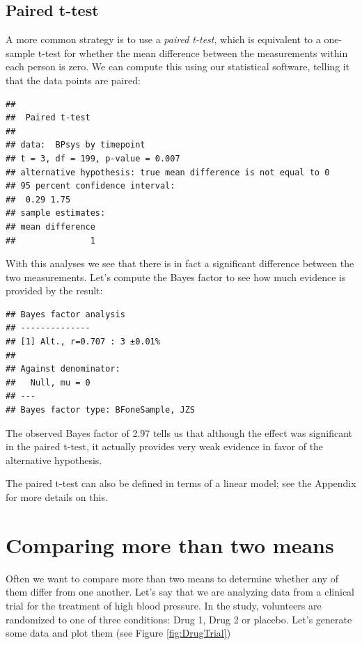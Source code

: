\documentclass[
  12pt,
]{book}
\begin{document}
\hypertarget{paired-t-test}{%
\subsection{Paired t-test}\label{paired-t-test}}

A more common strategy is to use a \emph{paired t-test}, which is equivalent to a one-sample t-test for whether the mean difference between the measurements within each person is zero. We can compute this using our statistical software, telling it that the data points are paired:

\begin{verbatim}
## 
##  Paired t-test
## 
## data:  BPsys by timepoint
## t = 3, df = 199, p-value = 0.007
## alternative hypothesis: true mean difference is not equal to 0
## 95 percent confidence interval:
##  0.29 1.75
## sample estimates:
## mean difference 
##               1
\end{verbatim}

With this analyses we see that there is in fact a significant difference between the two measurements. Let's compute the Bayes factor to see how much evidence is provided by the result:

\begin{verbatim}
## Bayes factor analysis
## --------------
## [1] Alt., r=0.707 : 3 ±0.01%
## 
## Against denominator:
##   Null, mu = 0 
## ---
## Bayes factor type: BFoneSample, JZS
\end{verbatim}

The observed Bayes factor of 2.97 tells us that although the effect was significant in the paired t-test, it actually provides very weak evidence in favor of the alternative hypothesis.

The paired t-test can also be defined in terms of a linear model; see the Appendix for more details on this.

\hypertarget{comparing-more-than-two-means}{%
\section{Comparing more than two means}\label{comparing-more-than-two-means}}

Often we want to compare more than two means to determine whether any of them differ from one another. Let's say that we are analyzing data from a clinical trial for the treatment of high blood pressure. In the study, volunteers are randomized to one of three conditions: Drug 1, Drug 2 or placebo. Let's generate some data and plot them (see Figure \ref{fig:DrugTrial})
\end{document}
